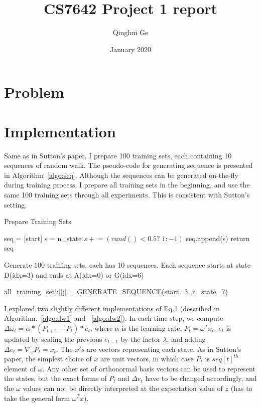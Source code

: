 \documentclass{article}
\title{CS7642 Project 1 report}
\author{Qinghui Ge}
\date{January 2020}
\newcommand{\pluseq}{\mathrel{+}=}
\begin{document}
\maketitle

\section{Problem}

\section{Implementation}
Same as in Sutton's paper, I prepare 100 training sets, each containing 10 sequences of random walk. The pseudo-code for generating sequence is presented in Algorithm~\ref{algo:seq}. Although the sequences can be generated on-the-fly during training process, I prepare all training sets in the beginning, and use the same 100 training sets through all experiments. This is consistent with Sutton's setting.


\begin{algorithm}[h!]
\caption{Prepare Training Sets}
\begin{algorithmic}
    \State seq = [start]
    \State s = n\_state
        \State $s \pluseq (rand()<0.5?\; 1: -1)$
        \State seq.append(s)
    \EndWhile
    \State return seq
\EndFunction

\Comment Generate 100 training sets, each has 10 sequences. Each sequence starts at state D(idx=3) and ends at A(idx=0) or G(idx=6)

        \State all\_training\_set[i][j] = GENERATE\_SEQUENCE(start=3, n\_state=7)
    \EndFor
\EndFor

\end{algorithmic}
\label{algo:seq}
\end{algorithm}

I explored two slightly different implementations of Eq.1 (described in Algorithm.~\ref{algo:dw1} and ~\ref{algo:dw2}). In each time step, we compute $\Delta \omega_t = \alpha * (P_{t+1}-P_t) * e_t$, where $\alpha$ is the learning rate, $P_t = \omega^T x_t$. $e_t$ is updated by scaling the previous $e_{t-1}$ by the factor $\lambda$, and adding $\Delta e_t = \nabla_\omega P_t = x_t$. The $x's$ are vectors representing each state. As in Sutton's paper, the simplest choice of $x$ are unit vectors, in which case $P_t$ is $seq[t]^{th}$ element of $\omega$. Any other set of orthonormal basis vectors can be used to represent the states, but the exact forms of $P_t$ and $\Delta e_t$ have to be changed accordingly, and the $\omega$ values can not be directly interpreted at the expectation value of $z$ (has to take the general form $\omega^T x$).
\end{document}
